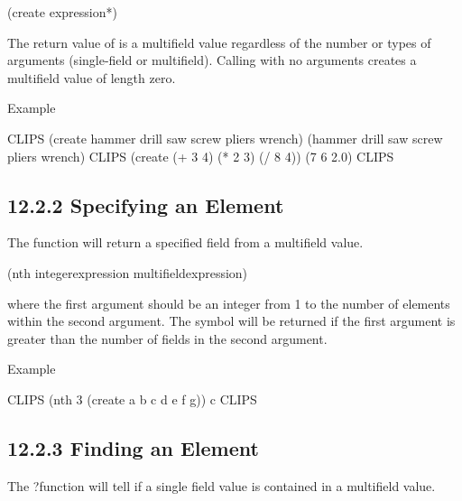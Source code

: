 \documentclass[letterpaper,10pt,english]{sphinxmanual}
\begin{document}

\begin{sphinxVerbatim}[commandchars=\\\{\}]
(create\PYGZdl{} \PYGZlt{}expression\PYGZgt{}*)
\end{sphinxVerbatim}

The return value of  is a multifield value regardless of the
number or types of arguments (single-field or multifield). Calling
 with no arguments creates a multifield value of length zero.

Example

\begin{sphinxVerbatim}[commandchars=\\\{\}]
CLIPS (create\PYGZdl{} hammer drill saw screw pliers wrench)
(hammer drill saw screw pliers wrench)
CLIPS\PYGZgt{} (create\PYGZdl{} (+ 3 4) (\PYGZbs{}* 2 3) (/ 8 4))
(7 6 2.0)
CLIPS\PYGZgt{}
\end{sphinxVerbatim}


\subsection{12.2.2 Specifying an Element}
\label{\detokenize{actions:specifying-an-element}}
The  function will return a specified field from a multifield
value.


\begin{sphinxVerbatim}[commandchars=\\\{\}]
(nth\PYGZdl{} \PYGZlt{}integer\PYGZhy{}expression\PYGZgt{} \PYGZlt{}multifield\PYGZhy{}expression\PYGZgt{})
\end{sphinxVerbatim}

where the first argument should be an integer from 1 to the number of
elements within the second argument. The symbol  will be returned
if the first argument is greater than the number of fields in the second
argument.

Example

\begin{sphinxVerbatim}[commandchars=\\\{\}]
CLIPS\PYGZgt{} (nth\PYGZdl{} 3 (create\PYGZdl{} a b c d e f g))
c
CLIPS\PYGZgt{}
\end{sphinxVerbatim}


\subsection{12.2.3 Finding an Element}
\label{\detokenize{actions:finding-an-element}}
The ?function will tell if a single field value is contained
in a multifield value.
\end{document}
